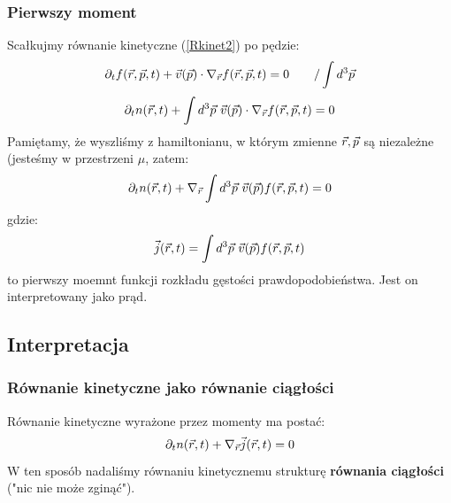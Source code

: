 \subsubsection{Pierwszy moment}
Scałkujmy równanie kinetyczne (\ref{Rkinet2}) po pędzie:
\begin{equation}\partial_tf(\vec{r},\vec{p},t)+\vec{v}(\vec{p})\cdot\nabla_{\vec{r}}f(\vec{r},\vec{p},t)=0~~~~~~/\int d^3 \vec{p}\nonumber \end {equation}
\begin{equation}\partial_t n(\vec{r},t)+\int d^3\vec{p} ~\vec{v}(\vec{p})\cdot\nabla_{\vec{r}}f(\vec{r},\vec{p},t)=0 \nonumber\end{equation}
Pamiętamy, że wyszliśmy z hamiltonianu, w którym zmienne $\vec{r},\vec{p}$ są niezależne (jesteśmy w przestrzeni $\mu$, zatem:
\begin{equation}\partial_t n(\vec{r},t)+\nabla_{\vec{r}}\int d^3\vec{p}~\vec{v}(\vec{p})f(\vec{r},\vec{p},t)=0 \nonumber\end{equation}
gdzie:
\begin{equation}\vec{j}(\vec{r},t)=\int d^3\vec{p}~\vec{v}(\vec{p})f(\vec{r},\vec{p},t)\end{equation}
to pierwszy moemnt funkcji rozkładu gęstości prawdopodobieństwa. Jest on interpretowany jako prąd.
\subsection{Interpretacja}
\subsubsection{Równanie kinetyczne jako równanie ciągłości}
Równanie kinetyczne wyrażone przez momenty ma postać:
\begin{equation}\partial_t n(\vec{r},t)+\nabla_{\vec{r}}\vec{j}(\vec{r},t)=0\end{equation}
W ten sposób nadaliśmy równaniu kinetycznemu strukturę \textbf{równania ciągłości} ("nic nie może zginąć").
